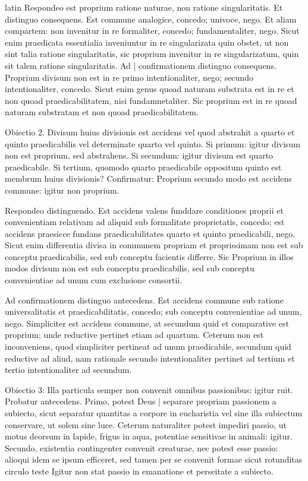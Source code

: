\begin{otherlanguage*}{latin}
\pstart
  Respondeo est proprium ratione naturae, non ratione singularitatis. Et distinguo consequens. Est commune analogice, concedo; univoce, nego. Et aliam compartem: non invenitur in re formaliter, concedo; fundamentaliter, nego. Sicut enim praedicata essentialia inveniuntur in re singularizata quin obstet, ut non sint talia ratione singularitatis, sic proprium invenitur in re singularizatum, quin sit talem ratione singularitatis. Ad \textnormal{|}   confirmationem distinguo consequens. Proprium divisum non est in re primo intentionaliter, nego; secundo intentionaliter, concedo. Sicut enim genus quoad naturam substrata est in re et non quoad praedicabilitatem, nisi fundamnetaliter. Sic proprium est in re quoad naturam substratam et non quoad praedicabilitatem. 
\pend

\pstart
  Obiectio 2. Divisum huius divisionis est accidens vel quod abstrahit a quarto et quinto praedicabilis vel determinate quarto vel quinto. Si primum: igitur divisum non est proprium, sed abstrahens. Si secundum: igitur divisum est quarto praedicabile. Si tertium, quomodo quarto praedicabile oppositum quinto est membrum huius divisionis? Confirmatur: Proprium secundo modo est accidens commune: igitur non proprium. 
\pend

\pstart
  Respondeo distinguendo. Est accidens valens funddare conditiones proprii et convenientiam relativam ad aliquid sub formalitate proprietatis, concedo; est accidens praesicce fundans praedicabilitates quarto et quinto praedicabili, nego. Sicut enim differentia divisa in communem propriam et proprissimam non est sub conceptu praedicabilis, sed sub conceptu facientis differre. Sic Proprium in illos modos divisum non est sub conceptu praedicabilis, sed sub conceptu convenientiae ad unum cum exclusione consortii. 
\pend

\pstart
  Ad confirmationem distinguo antecedens. Est accidens commune sub ratione universalitatis et praedicabilitatis, concedo; sub conceptu convenientiae ad unum, nego. Simpliciter est accidens commune, at secundum quid et comparative est proprium; unde reductive pertinet etiam ad quartum. Ceterum non est inconveniens, quod simpliciter pertineat ad unum praedicabile, secundum quid reductive ad aliud, nam rationale secundo intentionaliter pertinet ad tertium et tertio intentionaliter ad secundum. 
\pend

\pstart
  Obiectio 3: Illa particula semper non convenit omnibus passionibus: igitur ruit. Probatur antecedens. Primo, potest Deus \textnormal{|} separare propriam passionem a subiecto, sicut separatur quantitas a corpore in eucharistia vel sine illa subiectum conservare, ut solem sine luce. Ceterum naturaliter potest impediri passio, ut motus deorsum in lapide, frigus in aqua, potentiae sensitivae in animali: igitur. Secundo, existentia contingenter convenit creaturae, nec potest esse passio: alioqui idem se ipsum efficeret, sed tamen per se convenit formae sicut rotunditas circulo teste  Igitur non stat passio in emanatione et perseitate a subiecto. 
\pend


\end{otherlanguage*}
